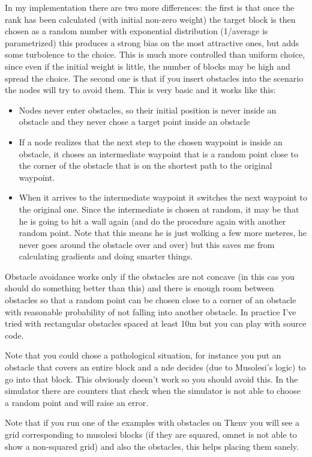\documentclass[12pt, a4]{article}
\theoremstyle{definition}
\begin{document}
In my implementation there are two more differences: the first is that once the
rank has been calculated (with initial non-zero weight)  the target block is
then chosen as a random number with exponential distribution (1/average is
parametrized) this produces a strong bias on the most attractive ones, but adds
some turbolence to the choice. This is much more controlled than uniform choice,
since even if the initial weight is little, the number of blocks may be high and
spread the choice. The second one is that if you insert obstacles into the
scenario the nodes will try to avoid them. This is very basic and it works like
this:
\begin{itemize}
\item Nodes never enter obstacles, so their initial position is never inside an
obstacle and they never chose a target point inside an obstacle
\item If a node realizes that the next step to the chosen waypoint is inside an
obstacle, it choses an intermediate waypoint that is a random point close to the
corner of the obstacle that is on the shortest path to the original waypoint. 
\item When it arrives to the intermediate waypoint it switches the next waypoint
to the original one. Since the intermediate is chosen at random, it may be that
he is going to hit a wall again (and do the procedure again with another random
point. Note that this means he is just wolking a few more meteres, he never goes
around the obstacle over and over) but this saves me from calculating gradients
and doing smarter things.
\end{itemize}

Obstacle avoidance works only if the obstacles are not concave (in this cas you
should do something better than this) and there is enough room between obstacles
so that a random point can be chosen close to a corner of an obstacle with reasonable
probability of not falling into another obstacle. In practice I've tried with
rectangular obstacles spaced at least 10m but you can play with source code.

Note that you could chose a pathological situation, for instance you put an
obstacle that covers an entire block and a nde decides (due to Musolesi's logic)
to go into that block. This obviously doesn't work so you should avoid this. In
the simulator there are counters that check when the simulator is not able to
choose a random point and will raise an error. 

Note that if you run one of the examples with obstacles on Tkenv you will see a
grid corresponding to musolesi blocks (if they are squared, omnet is not able to
show a non-squared grid) and also the obstacles, this helps placing them sanely. 
\end{document}
